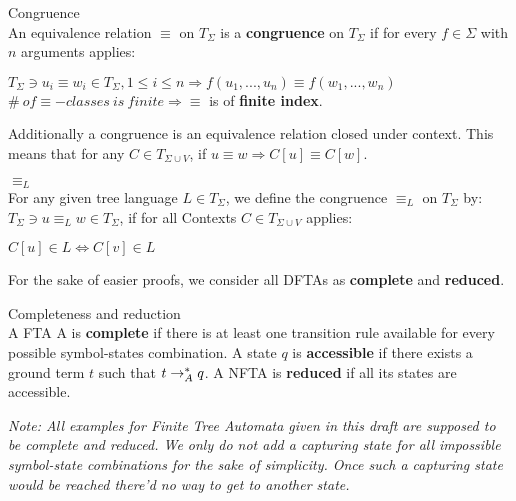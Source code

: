 \documentclass{llncs}
\begin{document}
\begin{definition}{Congruence} \cite{tata-nfta} \\
	An equivalence relation \(\equiv\)  on \(T_\Sigma\) is a \textbf{congruence} on \(T_\Sigma\) if for every \(f \in \Sigma\) with \(n\) arguments applies:
	\begin{center}
		\(T_\Sigma \ni u_i \equiv w_i \in T_\Sigma, 1 \leq i \leq n \Rightarrow f(u_1, ..., u_n) \equiv f(w_1, ..., w_n)\)\\
		\(\#~of \equiv-classes~is~finite \Rightarrow \equiv\) is of \textbf{finite index}.
	\end{center}
	Additionally a congruence is an equivalence relation closed under context. This means that for any \(C \in T_{\Sigma \cup V}\), if \(u \equiv w \Rightarrow C[u] \equiv C[w]\).
\end{definition}

\pagebreak

\begin{definition}{\(\equiv_L\)} \cite{tata-nfta} \\
	For any given tree language \(L \in T_\Sigma\), we define the congruence \(\equiv_L\) on \(T_\Sigma\) by: \(T_\Sigma \ni u \equiv_L w \in T_\Sigma\), if for all Contexts \(C \in T_{\Sigma \cup V}\) applies:
	\begin{center}
		\(C[u] \in L \iff C[v] \in L\)
	\end{center}
\end{definition}

For the sake of easier proofs, we consider all DFTAs as \textbf{complete} and \textbf{reduced}.

\begin{definition}{Completeness and reduction} \cite{wiki-tree-automaton}\\
A FTA A is \textbf{complete} if there is at least one transition rule available for every possible symbol-states combination. A state \(q\) is \textbf{accessible} if there exists a ground term \(t\) such that \(t \rightarrow_A^* q\). A NFTA is \textbf{reduced} if all its states are accessible.
\end{definition}

\textit{Note: All examples for Finite Tree Automata given in this draft are supposed to be complete and reduced. We only do not add a capturing state for all impossible symbol-state combinations for the sake of simplicity. Once such a capturing state would be reached there'd no way to get to another state.}
\\\\
\end{document}
